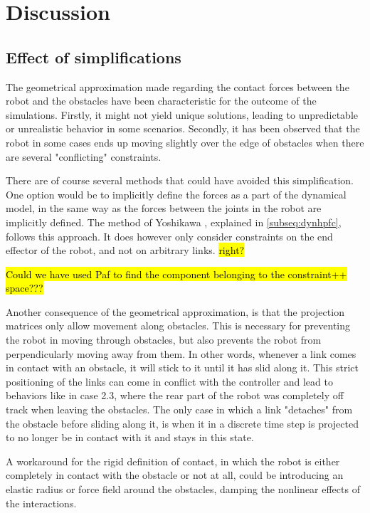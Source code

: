 \chapter{Discussion} \label{ch:discussion}

\section{Effect of simplifications}

The geometrical approximation made regarding the contact forces between the robot and the obstacles have been characteristic for the outcome of the simulations. Firstly, it might not yield unique solutions, leading to unpredictable or unrealistic behavior in some scenarios. Secondly, it has been observed that the robot in some cases ends up moving slightly over the edge of obstacles when there are several "conflicting" constraints.

There are of course several methods that could have avoided this simplification.
One option would be to implicitly define the forces as a part of the dynamical model, in the same way as the forces between the joints in the robot are implicitly defined. The method of Yoshikawa \cite{yoshikawa1987dynamic}, explained in \ref{subseq:dynhpfc}, follows this approach. It does however only consider constraints on the end effector of the robot, and not on arbitrary links. \hl{right?}

\hl{Could we have used Paf to find the component belonging to the constraint++ space???}

Another consequence of the geometrical approximation, is that the projection matrices only allow movement along obstacles. This is necessary for preventing the robot in moving through obstacles, but also prevents the robot from perpendicularly moving away from them. In other words, whenever a link comes in contact with an obstacle, it will stick to it until it has slid along it. This strict positioning of the links can come in conflict with the controller and lead to behaviors like in case 2.3, where the rear part of the robot was completely off track when leaving the obstacles. The only case in which a link "detaches" from the obstacle before sliding along it, is when it in  a discrete time step is projected to no longer be in contact with it and stays in this state.

A workaround for the rigid definition of contact, in which the robot is either completely in contact with the obstacle or not at all, could be introducing an elastic radius or force field around the obstacles, damping the nonlinear effects of the interactions. %

